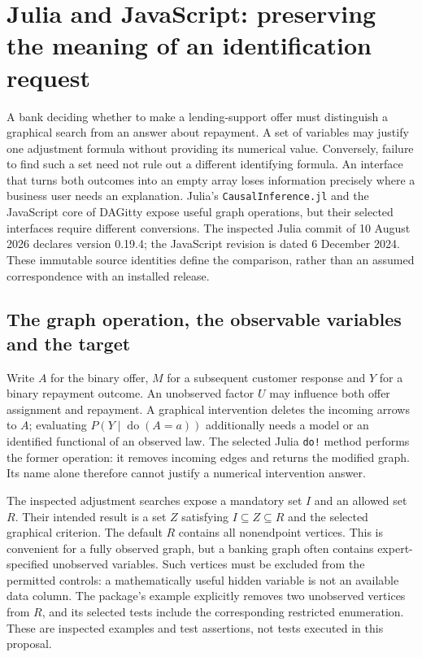\section{Julia and JavaScript: preserving the meaning of an identification request}
\label{exec19:otherid-scope}

A bank deciding whether to make a lending-support offer must distinguish a
graphical search from an answer about repayment. A set of variables may justify
one adjustment formula without providing its numerical value. Conversely,
failure to find such a set need not rule out a different identifying formula.
An interface that turns both outcomes into an empty array loses information
precisely where a business user needs an explanation. Julia's
\texttt{CausalInference.jl} and the JavaScript core of DAGitty expose useful
graph operations, but their selected interfaces require different conversions.
The inspected Julia commit of 10 August 2026 declares version 0.19.4; the
JavaScript revision is dated 6 December 2024. These immutable source identities
define the comparison, rather than an assumed correspondence with an installed
release.~\citep{exec19_otherid_julia,exec19_otherid_dagitty}

\subsection{The graph operation, the observable variables and the target}
\label{exec19:otherid-graph}
Write $A$ for the binary offer, $M$ for a subsequent customer response and $Y$
for a binary repayment outcome. An unobserved factor $U$ may influence both
offer assignment and repayment. A graphical intervention deletes the incoming
arrows to $A$; evaluating $P(Y\mid\operatorname{do}(A=a))$ additionally needs
a model or an identified functional of an observed law. The selected Julia
\texttt{do!} method performs the former operation: it removes incoming edges
and returns the modified graph. Its name alone therefore cannot justify a
numerical intervention answer.~\citep{exec19_otherid_julia}

The inspected adjustment searches expose a mandatory set $I$ and an allowed
set $R$. Their intended result is a set $Z$ satisfying $I\subseteq Z\subseteq R$
and the selected graphical criterion. The default $R$ contains all nonendpoint
vertices. This is convenient for a fully observed graph, but a banking graph
often contains expert-specified unobserved variables. Such vertices must be
excluded from the permitted controls: a mathematically useful hidden variable
is not an available data column. The package's example explicitly removes two
unobserved vertices from $R$, and its selected tests include the corresponding
restricted enumeration. These are inspected examples and test assertions, not
tests executed in this proposal.~\citep{exec19_otherid_julia}

